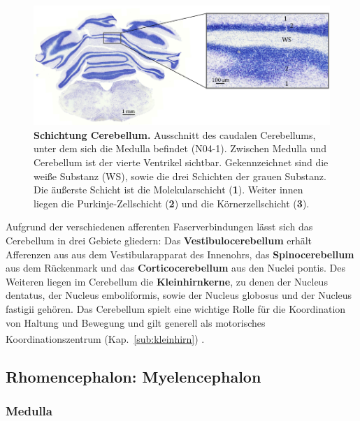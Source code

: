 \documentclass[12pt,a4paper,pdftex]{article}
\begin{document}
\begin{figure}[H]
    \centering
    \includegraphics[width=\textwidth]{pictures/Bilder_Jule/Ratte/cerebellum.png}
    \caption[Schichtung Cerebellum]{\textbf{Schichtung Cerebellum.} Ausschnitt des caudalen Cerebellums, unter dem sich die Medulla befindet (N04-1). Zwischen Medulla und Cerebellum ist der vierte Ventrikel sichtbar. Gekennzeichnet sind die weiße Substanz (WS), sowie die drei Schichten der grauen Substanz. Die äußerste Schicht ist die Molekularschicht (\textbf{1}). Weiter innen liegen die Purkinje-Zellschicht (\textbf{2}) und die Körnerzellschicht (\textbf{3}).}
    \label{fig:cerebellum_ratte}
\end{figure}

\noindent Aufgrund der verschiedenen afferenten Faserverbindungen lässt sich das Cerebellum in drei Gebiete gliedern: Das \textbf{Vestibulocerebellum} erhält Afferenzen aus aus dem Vestibularapparat des Innenohrs, das \textbf{Spinocerebellum} aus dem Rückenmark und das \textbf{Corticocerebellum} aus den Nuclei pontis. Des Weiteren liegen im Cerebellum die \textbf{Kleinhirnkerne}, zu denen der Nucleus dentatus, der Nucleus emboliformis, sowie der Nucleus globosus und der Nucleus fastigii gehören. Das Cerebellum spielt eine wichtige Rolle für die Koordination von Haltung und Bewegung und gilt generell als motorisches Koordinationszentrum (Kap.~\ref{sub:kleinhirn}) \textsuperscript{\cite[7]{trepel2011neuroanatomie}}.

\subsection{Rhomencephalon: Myelencephalon}
\label{subsec:Myelencephalon} 

\subsubsection{Medulla} 
\end{document}
